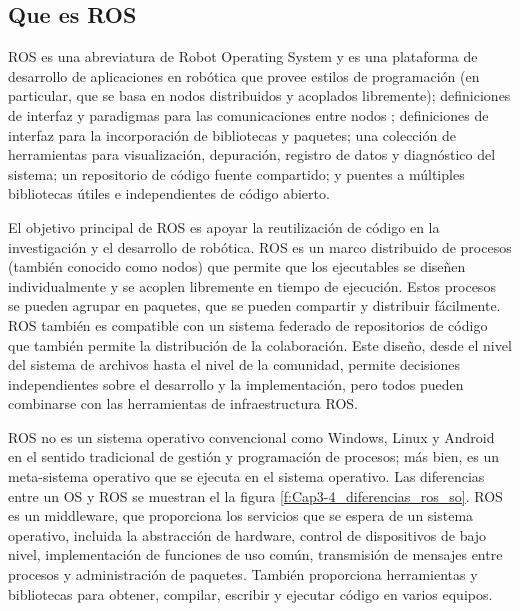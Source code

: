     \newpage


    \subsection{Que es ROS}
       ROS es una abreviatura de  Robot Operating System y es una plataforma de desarrollo de aplicaciones en robótica que provee estilos de programación (en particular, que se basa en nodos distribuidos y acoplados libremente); definiciones de interfaz y paradigmas para las comunicaciones entre nodos ; definiciones de interfaz para la incorporación de bibliotecas y paquetes; una colección de herramientas para visualización, depuración, registro de datos y diagnóstico del sistema; un repositorio de código fuente compartido; y puentes a múltiples bibliotecas útiles e independientes de código abierto.
       
       El objetivo principal de ROS es apoyar la reutilización de código en la investigación y el desarrollo de robótica. ROS es un marco distribuido de procesos (también conocido como nodos) que permite que los ejecutables se diseñen individualmente y se acoplen libremente en tiempo de ejecución. Estos procesos se pueden agrupar en paquetes, que se pueden compartir y distribuir fácilmente. ROS también es compatible con un sistema federado de repositorios de código que también permite la distribución de la colaboración. Este diseño, desde el nivel del sistema de archivos hasta el nivel de la comunidad, permite decisiones independientes sobre el desarrollo y la implementación, pero todos pueden combinarse con las herramientas de infraestructura ROS.
       
       ROS no es un sistema operativo convencional como Windows, Linux y Android en el sentido tradicional de gestión y programación de procesos; más bien, es un meta-sistema operativo que se ejecuta en el sistema operativo. Las diferencias entre un OS y ROS se muestran el la figura \eqref{f:Cap3-4_diferencias_ros_so}. ROS es un middleware, que proporciona los servicios que se espera de un sistema operativo, incluida la abstracción de hardware, control de dispositivos de bajo nivel, implementación de funciones de uso común, transmisión de mensajes entre procesos y administración de paquetes. También proporciona herramientas y bibliotecas para obtener, compilar, escribir y ejecutar código en varios equipos.
       
